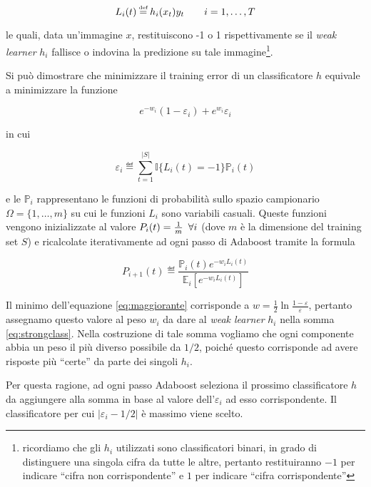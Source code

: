  \[ L_i(t) \eqdef h_i(x_t)y_t \hskip 2em  i = 1, \dotsc, T \]
 
le quali, data un'immagine $x$, restituiscono -1 o 1 rispettivamente se il {\it weak learner} $h_i$ fallisce o indovina la predizione su tale immagine\footnote{ricordiamo che gli $h_i$ utilizzati sono classificatori binari, in grado di distinguere una singola cifra da tutte le altre, pertanto restituiranno $-1$ per indicare ``cifra non corrispondente'' e $1$ per indicare ``cifra corrispondente''}.

Si pu\`o dimostrare che minimizzare il training error di un classificatore $h$ equivale a minimizzare la funzione

\begin{equation} \label{eq:maggiorante}
e^{-w_i}(1 - \varepsilon_i) + e^{w_i}\varepsilon_i 
\end{equation}

in cui

\[ \varepsilon_i \eqdef \sum\limits_{t=1}^{|S|}{\mathbb{I}\{L_i(t) = -1\}\mathbb{P}_i(t) } \]

e le $\mathbb{P}_i$ rappresentano le funzioni di probabilit\`a sullo spazio campionario \(\Omega = \{1, \dotsc, m\}\) su cui le funzioni $L_i$ sono variabili casuali. Queste funzioni vengono inizializzate al valore \(P_i(t) = \frac{1}{m} \hskip 0.5em \forall i \) (dove $m$ \`e la dimensione del training set $S$) e ricalcolate iterativamente ad ogni passo di Adaboost tramite la formula

\[ P_{i+1}(t) \eqdef \frac{\mathbb{P}_i(t)e^{-w_iL_i(t)}}{\mathbb{E}_i[e^{-w_iL_i(t)}]} \]

Il minimo dell'equazione \ref{eq:maggiorante} corrisponde a \(w = \frac{1}{2} \ln{\frac{1 - \varepsilon}{\varepsilon}}\), pertanto assegnamo questo valore al peso $w_i$ da dare al {\it weak learner} $h_i$ nella somma \ref{eq:strongclass}.
Nella costruzione di tale somma vogliamo che ogni componente abbia un peso il pi\`u  diverso possibile da $1/2$, poich\'e questo corrisponde ad avere risposte pi\`u ``certe'' da parte dei singoli $h_i$.

Per questa ragione, ad ogni passo Adaboost seleziona il prossimo classificatore $h$ da aggiungere alla somma in base al valore dell'$\varepsilon_i$ ad esso corrispondente. Il classificatore per cui \(|\varepsilon_i - 1/2|\) \`e massimo viene scelto.